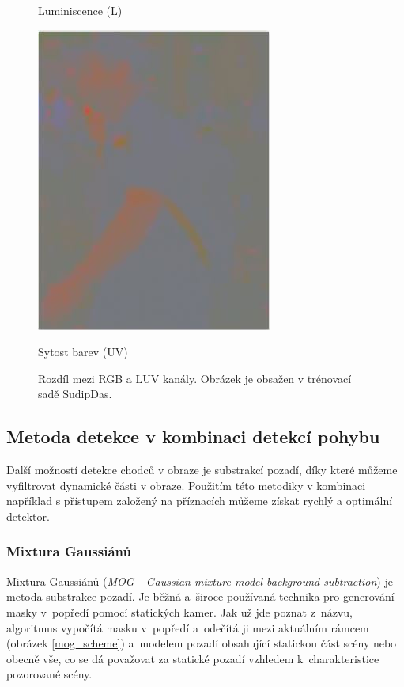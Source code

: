 \begin{figure}[H]
\begin{minipage}[b]{.3\textwidth}
  \caption*{Luminiscence  (L)}
\end{minipage}
\begin{minipage}[b]{.3\textwidth}
  \centering
  \includegraphics[width=.7\linewidth]{figures/uv_chroma}
  \caption*{Sytost barev (UV)}
\end{minipage}
\caption{Rozdíl mezi RGB a LUV kanály. Obrázek je obsažen v trénovací sadě SudipDas. \cite{sudipdas}}
\label{fig:luv}
\end{figure}

\subsection{Metoda detekce v kombinaci detekcí pohybu} %
Další možností detekce chodců v obraze je substrakcí pozadí, díky které můžeme vyfiltrovat dynamické části v obraze. Použitím této metodiky v kombinaci například s přístupem založený na příznacích můžeme získat rychlý a optimální detektor.

\subsubsection*{Mixtura Gaussiánů}
Mixtura Gaussiánů (\textit{MOG - Gaussian mixture model background subtraction}) \cite{mog:zivkovic} je metoda substrakce pozadí.  Je běžná a~široce používaná technika pro generování masky v~popředí pomocí statických kamer. Jak už jde poznat z~názvu, algoritmus vypočítá masku v~popředí a~odečítá ji mezi aktuálním rámcem (obrázek \ref{mog_scheme}) a~modelem pozadí obsahující statickou část scény nebo obecně vše, co se dá považovat za statické pozadí vzhledem k~charakteristice pozorované scény. 

